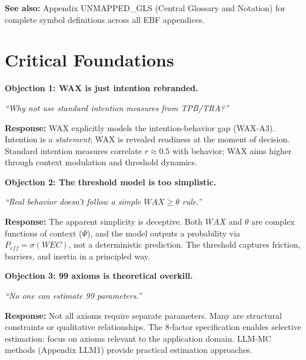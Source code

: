 \textbf{See also:} Appendix UNMAPPED_GLS (Central Glossary and Notation) for complete symbol definitions across all EBF appendices.


\section{Critical Foundations}
\label{sec:av-foundations}

\begin{tcolorbox}[colback=red!5!white, colframe=red!75!black,
    title=\textbf{Critical Foundations: Objections and Responses}]

\textbf{Objection 1: WAX is just intention rebranded.}

\textit{``Why not use standard intention measures from TPB/TRA?''}

\textbf{Response:} WAX explicitly models the intention-behavior gap (WAX-A3).
Intention is a \emph{statement}; WAX is revealed readiness at the moment of decision.
Standard intention measures correlate $r \approx 0.5$ with behavior; WAX aims higher
through context modulation and threshold dynamics.

\medskip

\textbf{Objection 2: The threshold model is too simplistic.}

\textit{``Real behavior doesn't follow a simple $WAX \geq \theta$ rule.''}

\textbf{Response:} The apparent simplicity is deceptive. Both $WAX$ and $\theta$ are
complex functions of context ($\Psi$), and the model outputs a probability via
$P_{eff} = \sigma(WEC)$, not a deterministic prediction. The threshold captures
friction, barriers, and inertia in a principled way.

\medskip

\textbf{Objection 3: 99 axioms is theoretical overkill.}

\textit{``No one can estimate 99 parameters.''}

\textbf{Response:} Not all axioms require separate parameters. Many are structural
constraints or qualitative relationships. The 8-factor specification enables
selective estimation: focus on axioms relevant to the application domain.
LLM-MC methods (Appendix LLM1) provide practical estimation approaches.

\end{tcolorbox}

